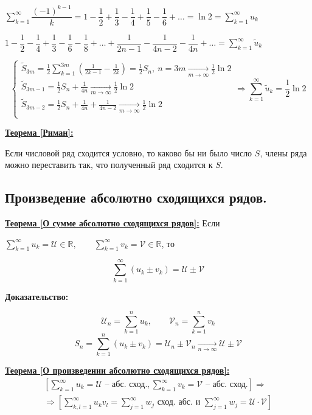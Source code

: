 \documentclass[a4paper,12pt]{article} %
\newcommand{\R}{\mathbb{R}}
\newcommand{\series}{\sum\limits_{k=1}^{\infty}}
\newcommand{\useries}{\sum\limits_{k=1}^{\infty} u_k}
\newcommand{\sn}{\sum\limits_{k=1}^{n} u_k}
\begin{document}
$\series \dfrac{(-1)^{k-1}}{k} = 1 - \dfrac{1}{2} + \dfrac{1}{3} - \dfrac{1}{4} + \dfrac{1}{5} - \dfrac{1}{6} + \ldots = \ln 2 = \useries$

$1 - \dfrac{1}{2} - \dfrac{1}{4} + \dfrac{1}{3} - \dfrac{1}{6} - \dfrac{1}{8} + \ldots + \dfrac{1}{2n-1} - \dfrac{1}{4n-2} - \dfrac{1}{4n} + \ldots = \sum\limits_{k=1}^{\infty} \tilde{u}_k$

\begin{equation*}
	\begin{cases}
		\tilde{S}_{3m} = \frac{1}{2} \sum\limits_{k=1}^{3m}\left( \frac{1}{2k-1} - \frac{1}{2k} \right) = \frac{1}{2} S_{n}, \ n=3m \xrightarrow[m \to \infty]{} \frac{1}{2} \ln 2\\
		\tilde{S}_{3m - 1} = \frac{1}{2} S_n + \frac{1}{4n} \xrightarrow[m \to \infty]{} \frac{1}{2} \ln 2 \\
		\tilde{S}_{3m - 2} = \frac{1}{2} S_n + \frac{1}{4n} + \frac{1}{4n-2} \xrightarrow[m \to \infty]{} \frac{1}{2} \ln 2 \\
	\end{cases}
	\Rightarrow \sum\limits_{k=1}^{\infty} \tilde{u}_k = \dfrac{1}{2} \ln 2
\end{equation*}

\underline{\textbf{Теорема [Риман]:}}

Если числовой ряд сходится условно, то каково бы ни было число $S$, члены ряда можно переставить так, что полученный ряд сходится к $S$.

\subsection{Произведение абсолютно сходящихся рядов.}

\underline{\textbf{Теорема [О сумме абсолютно сходящихся рядов]:}} Если

$\useries = \mathscr{U} \in \R, \hspace{2em} \series v_k = \mathscr{V} \in \R$, то

\[ \series (u_k \pm v_k) = \mathscr{U} \pm \mathscr{V} \]

\textbf{Доказательство:}

\[ \mathscr{U}_n = \sn, \hspace{2em} \mathscr{V}_n = \sum\limits_{k=1}^{n}v_k \]
\[ S_n = \sum\limits_{k=1}^{n}(u_k \pm v_k) = \mathscr{U}_n \pm \mathscr{V}_n \xrightarrow[n \to \infty]{} \mathscr{U} \pm \mathscr{V} \]

\underline{\textbf{Теорема [О произведении абсолютно сходящихся рядов]:}}
\begin{multline*}
	\left[ \useries = \mathscr{U} \text{ -- абс. сход.}, \sum\limits_{k=1}^{\infty}v_k = \mathscr{V} \text{ -- абс. сход.} \right] \Rightarrow \\ \Rightarrow \left[ \sum\limits_{k, l =1}^{\infty}u_k v_l = \sum\limits_{j=1}^{\infty} w_j \text{ сход. абс. и } \sum\limits_{j=1}^{\infty} w_j = \mathscr{U} \cdot \mathscr{V} \right]
\end{multline*}
\end{document}
